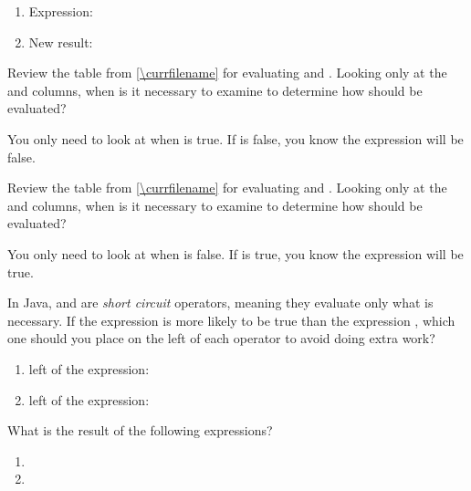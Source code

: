 \begin{enumerate}
\item Expression: 
\item New result: 
\end{enumerate}


\Q Review the table from \ref{\currfilename} for evaluating \java{&&} and \java{||}.
Looking only at the  and \java{&&} columns, when is it necessary to examine  to determine how  should be evaluated?

\begin{answer}
You only need to look at  when  is true.
If  is false, you know the expression will be false.
\end{answer}


\Q Review the table from \ref{\currfilename} for evaluating \java{&&} and \java{||}.
Looking only at the  and \java{||} columns, when is it necessary to examine  to determine how  should be evaluated?

\begin{answer}
You only need to look at  when  is false.
If  is true, you know the expression will be true.
\end{answer}


\Q In Java, \java{&&} and \java{||} are \emph{short circuit} operators, meaning they evaluate only what is necessary.
If the expression  is more likely to be true than the expression , which one should you place on the left of each operator to avoid doing extra work?

\begin{enumerate}
\item left of the \java{&&} expression:
\item left of the \java{||} expression:
\end{enumerate}


\Q What is the result of the following expressions?
\begin{enumerate}
\item {}
\item {}
\end{enumerate}
